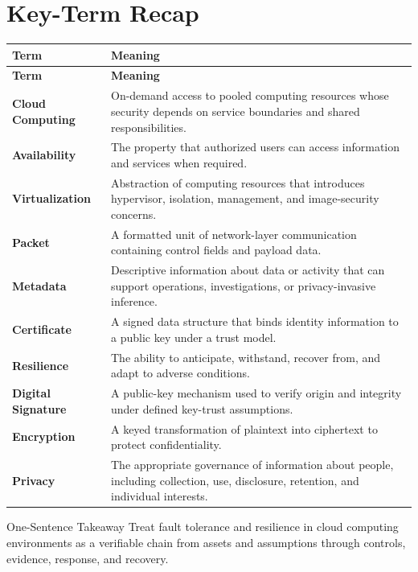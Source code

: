 \documentclass[11pt,letterpaper]{article}
\begin{document}
\section*{Key-Term Recap}
\begin{longtable}{>{\raggedright\arraybackslash}p{}>{\raggedright\arraybackslash}p{}}
\toprule\rowcolor{Navy}\color{white}\textbf{Term} & \color{white}\textbf{Meaning}\\\midrule
\endfirsthead
\toprule\rowcolor{Navy}\color{white}\textbf{Term} & \color{white}\textbf{Meaning}\\\midrule
\endhead
\textbf{Cloud Computing} & On-demand access to pooled computing resources whose security depends on service boundaries and shared responsibilities. \\\midrule
\textbf{Availability} & The property that authorized users can access information and services when required. \\\midrule
\textbf{Virtualization} & Abstraction of computing resources that introduces hypervisor, isolation, management, and image-security concerns. \\\midrule
\textbf{Packet} & A formatted unit of network-layer communication containing control fields and payload data. \\\midrule
\textbf{Metadata} & Descriptive information about data or activity that can support operations, investigations, or privacy-invasive inference. \\\midrule
\textbf{Certificate} & A signed data structure that binds identity information to a public key under a trust model. \\\midrule
\textbf{Resilience} & The ability to anticipate, withstand, recover from, and adapt to adverse conditions. \\\midrule
\textbf{Digital Signature} & A public-key mechanism used to verify origin and integrity under defined key-trust assumptions. \\\midrule
\textbf{Encryption} & A keyed transformation of plaintext into ciphertext to protect confidentiality. \\\midrule
\textbf{Privacy} & The appropriate governance of information about people, including collection, use, disclosure, retention, and individual interests. \\\midrule
\bottomrule
\end{longtable}
\begin{CornellExamBox}{One-Sentence Takeaway}
Treat fault tolerance and resilience in cloud computing environments as a verifiable chain from assets and assumptions through controls, evidence, response, and recovery.
\end{CornellExamBox}
\end{document}
